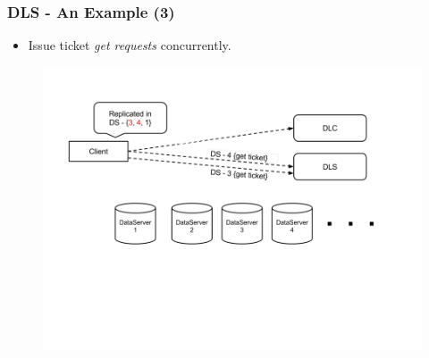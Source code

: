 \documentclass{beamer}
\begin{document}
\begin{frame}
  \frametitle{DLS - An Example (3)}
  \begin{itemize}
  \item Issue ticket \textit{get requests} concurrently.
\newline
  \end{itemize}
  \begin{figure}
    \begin{center}
      \centerline{\includegraphics[scale=0.40]{img/DLS_Example4.png}}
    \end{center}
  \end{figure}

\end{frame}
\end{document}
